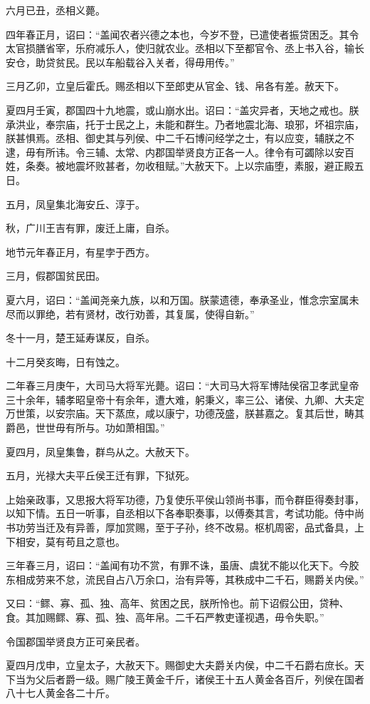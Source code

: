\documentclass[]{article}
\begin{document}
六月已丑，丞相义薨。

四年春正月，诏曰：``盖闻农者兴德之本也，今岁不登，已遣使者振贷困乏。其令太官损膳省宰，乐府减乐人，使归就农业。丞相以下至都官令、丞上书入谷，输长安仓，助贷贫民。民以车船载谷入关者，得毋用传。''

三月乙卯，立皇后霍氏。赐丞相以下至郎吏从官金、钱、帛各有差。赦天下。

夏四月壬寅，郡国四十九地震，或山崩水出。诏曰：``盖灾异者，天地之戒也。朕承洪业，奉宗庙，托于士民之上，未能和群生。乃者地震北海、琅邪，坏祖宗庙，朕甚惧焉。丞相、御史其与列侯、中二千石博问经学之士，有以应变，辅朕之不逮，毋有所讳。令三辅、太常、内郡国举贤良方正各一人。律令有可蠲除以安百姓，条奏。被地震坏败甚者，勿收租赋。''大赦天下。上以宗庙堕，素服，避正殿五日。

五月，凤皇集北海安丘、淳于。

秋，广川王吉有罪，废迁上庸，自杀。

地节元年春正月，有星孛于西方。

三月，假郡国贫民田。

夏六月，诏曰：``盖闻尧亲九族，以和万国。朕蒙遗德，奉承圣业，惟念宗室属未尽而以罪绝，若有贤材，改行劝善，其复属，使得自新。''

冬十一月，楚王延寿谋反，自杀。

十二月癸亥晦，日有蚀之。

二年春三月庚午，大司马大将军光薨。诏曰：``大司马大将军博陆侯宿卫孝武皇帝三十余年，辅孝昭皇帝十有余年，遭大难，躬秉义，率三公、诸侯、九卿、大夫定万世策，以安宗庙。天下蒸庶，咸以康宁，功德茂盛，朕甚嘉之。复其后世，畴其爵邑，世世毋有所与。功如萧相国。''

夏四月，凤皇集鲁，群鸟从之。大赦天下。

五月，光禄大夫平丘侯王迁有罪，下狱死。

上始亲政事，又思报大将军功德，乃复使乐平侯山领尚书事，而令群臣得奏封事，以知下情。五日一听事，自丞相以下各奉职奏事，以傅奏其言，考试功能。侍中尚书功劳当迁及有异善，厚加赏赐，至于子孙，终不改易。枢机周密，品式备具，上下相安，莫有苟且之意也。

三年春三月，诏曰：``盖闻有功不赏，有罪不诛，虽唐、虞犹不能以化天下。今胶东相成劳来不怠，流民自占八万余口，治有异等，其秩成中二千石，赐爵关内侯。''

又曰：``鳏、寡、孤、独、高年、贫困之民，朕所怜也。前下诏假公田，贷种、食。其加赐鳏、寡、孤、独、高年帛。二千石严教吏谨视遇，毋令失职。''

令国郡国举贤良方正可亲民者。

夏四月戊申，立皇太子，大赦天下。赐御史大夫爵关内侯，中二千石爵右庶长。天下当为父后者爵一级。赐广陵王黄金千斤，诸侯王十五人黄金各百斤，列侯在国者八十七人黄金各二十斤。
\end{document}
